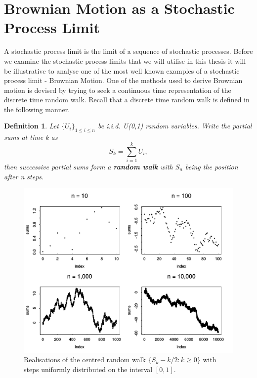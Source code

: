 \documentclass[honours,12pt]{unswthesis}
\newcommand{\1}{\mathbf 1}
\newtheorem{definition}[equation]{Definition}
\numberwithin{equation}{section}
\theoremstyle{definition}
\theoremstyle{remark}
\begin{document}
\section{Brownian Motion as a Stochastic Process Limit}\label{s:background}
A stochastic process limit is the limit of a sequence of stochastic processes. Before we examine the stochastic process limits that we will utilise in this thesis it will be illustrative to analyse one of the most well known examples of a stochastic process limit - Brownian Motion. One of the methods used to derive Brownian motion is devised by trying to seek a continuous time representation of the discrete time random walk. Recall that a discrete time random walk is defined in the following manner.\\
\begin{definition}
Let $\{U_i\}_{1\leq i \leq n}$ be i.i.d. U(0,1) random variables. Write the partial sums at time k as
\[
	S_k=\sum_{i=1}^k U_i,
\]
then successive partial sums form a \textbf{random walk} with $S_n$ being the position after n steps.
\\
\end{definition}

\begin{figure}[h]
\centering
\includegraphics[scale=1]{Figures/RandomWalk}
\caption{\cite{Whitt2010} Realisations of the centred random walk $\{S_k-k/2:k\geq0\}$ with steps uniformly distributed on the interval $[0,1]$.}
\label{fig:RandomWalk}
\end{figure}
\end{document}
